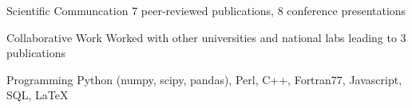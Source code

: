 


\begin{cvskills}


\cvskill
{Scientific Communcation} %
{7 peer-reviewed publications, 8 conference presentations} %


\cvskill
{Collaborative Work} %
{Worked with other universities and national labs leading to 3 publications} %


\cvskill
{Programming} %
{Python (numpy, scipy, pandas), Perl, C++, Fortran77, Javascript, SQL, LaTeX} %

\end{cvskills}
